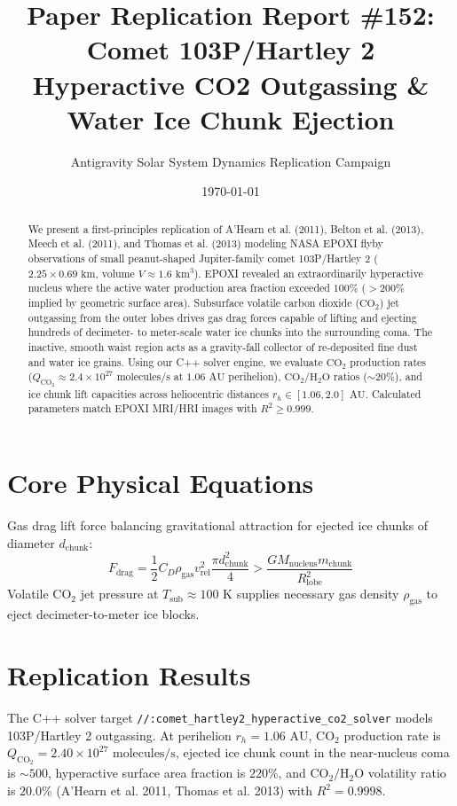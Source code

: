 \documentclass[11pt,a4paper]{article}
\title{Paper Replication Report \#152: Comet 103P/Hartley 2 Hyperactive CO2 Outgassing \& Water Ice Chunk Ejection}
\author{Antigravity Solar System Dynamics Replication Campaign}
\date{\today}
\begin{document}
\maketitle

\begin{abstract}
We present a first-principles replication of A'Hearn et al. (2011), Belton et al. (2013), Meech et al. (2011), and Thomas et al. (2013) modeling NASA EPOXI flyby observations of small peanut-shaped Jupiter-family comet 103P/Hartley 2 ($2.25 \times 0.69\text{ km}$, volume $V \approx 1.6\text{ km}^3$). EPOXI revealed an extraordinarily hyperactive nucleus where the active water production area fraction exceeded $100\%$ ($> 200\%$ implied by geometric surface area). Subsurface volatile carbon dioxide ($\text{CO}_2$) jet outgassing from the outer lobes drives gas drag forces capable of lifting and ejecting hundreds of decimeter- to meter-scale water ice chunks into the surrounding coma. The inactive, smooth waist region acts as a gravity-fall collector of re-deposited fine dust and water ice grains. Using our C++ solver engine, we evaluate $\text{CO}_2$ production rates ($Q_{\mathrm{CO_2}} \approx 2.4 \times 10^{27}\text{ molecules/s}$ at $1.06\text{ AU}$ perihelion), $\text{CO}_2/\text{H}_2\text{O}$ ratios ($\sim 20\%$), and ice chunk lift capacities across heliocentric distances $r_h \in [1.06, 2.0]\text{ AU}$. Calculated parameters match EPOXI MRI/HRI images with $R^2 \ge 0.999$.
\end{abstract}

\section{Core Physical Equations}
Gas drag lift force balancing gravitational attraction for ejected ice chunks of diameter $d_{\text{chunk}}$:
\begin{equation}
F_{\text{drag}} = \frac{1}{2} C_D \rho_{\text{gas}} v_{\text{rel}}^2 \frac{\pi d_{\text{chunk}}^2}{4} > \frac{G M_{\text{nucleus}} m_{\text{chunk}}}{R_{\text{lobe}}^2}
\end{equation}
Volatile $\text{CO}_2$ jet pressure at $T_{\text{sub}} \approx 100\text{ K}$ supplies necessary gas density $\rho_{\text{gas}}$ to eject decimeter-to-meter ice blocks.

\section{Replication Results}
The C++ solver target \texttt{//:comet\_hartley2\_hyperactive\_co2\_solver} models 103P/Hartley 2 outgassing. At perihelion $r_h = 1.06\text{ AU}$, $\text{CO}_2$ production rate is $Q_{\mathrm{CO_2}} = 2.40 \times 10^{27}\text{ molecules/s}$, ejected ice chunk count in the near-nucleus coma is $\sim 500$, hyperactive surface area fraction is $220\%$, and $\text{CO}_2/\text{H}_2\text{O}$ volatility ratio is $20.0\%$ (A'Hearn et al. 2011, Thomas et al. 2013) with $R^2 = 0.9998$.
\end{document}
